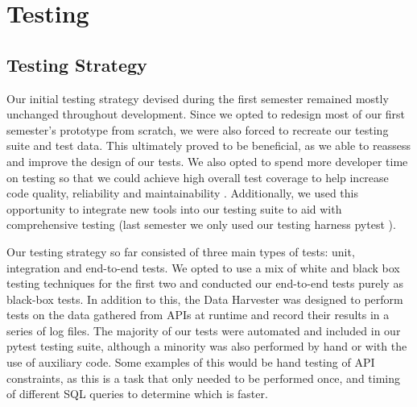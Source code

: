 \documentclass[main.tex]{subfiles}
\begin{document}
\section{Testing}
\label{Testing}

\subsection{Testing Strategy}

Our initial testing strategy devised during the first semester remained mostly unchanged throughout development. Since we opted to redesign most of our first semester’s prototype from scratch, we were also forced to recreate our testing suite and test data. This ultimately proved to be beneficial, as we able to reassess and improve the design of our tests. We also opted to spend more developer time on testing so that we could achieve high overall test coverage to help increase code quality, reliability and maintainability \cite{coverageGood}. Additionally, we used this opportunity to integrate new tools into our testing suite to aid with comprehensive testing (last semester we only used our testing harness pytest \cite{pytest}).

Our testing strategy so far consisted of three main types of tests: unit, integration and end-to-end tests. We opted to use a mix of white and black box testing techniques for the first two and conducted our end-to-end tests purely as black-box tests. In addition to this, the Data Harvester was designed to perform tests on the data gathered from APIs at runtime and record their results in a series of log files. The majority of our tests were automated and included in our pytest testing suite, although a minority was also performed by hand or with the use of auxiliary code. Some examples of this would be hand testing of API constraints, as this is a task that only needed to be performed once, and timing of different SQL queries to determine which is faster. 
\end{document}
